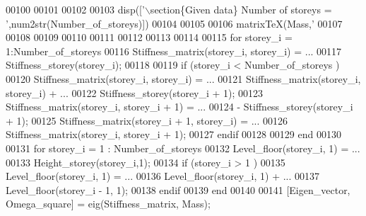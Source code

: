 \begin{DoxyCode}
{{{{{{{{{{{{{{{00100 \textcolor{stringliteral}{}
00101 \textcolor{stringliteral}{%
00102 \textcolor{stringliteral}{}
00103 \textcolor{stringliteral}{disp(['}\(\backslash\)section\{Given data\} Number of storeys = \textcolor{stringliteral}{',num2str(Number\_of\_storeys)])}
00104 \textcolor{stringliteral}{%
00105 \textcolor{stringliteral}{}
00106 \textcolor{stringliteral}{matrixTeX(Mass,'}%
00107 \textcolor{stringliteral}{}
00108 \textcolor{stringliteral}{%
00109 \textcolor{stringliteral}{}
00110 \textcolor{stringliteral}{%
00111 \textcolor{stringliteral}{}
00112 \textcolor{stringliteral}{%
00113 \textcolor{stringliteral}{%
00114 \textcolor{stringliteral}{}
00115 \textcolor{stringliteral}{for storey\_i = 1:Number\_of\_storeys}
00116 \textcolor{stringliteral}{  Stiffness\_matrix(storey\_i, storey\_i) = ...}
00117 \textcolor{stringliteral}{    Stiffness\_storey(storey\_i);}
00118 \textcolor{stringliteral}{}
00119 \textcolor{stringliteral}{  if (storey\_i < Number\_of\_storeys )}
00120 \textcolor{stringliteral}{    Stiffness\_matrix(storey\_i, storey\_i) = ...}
00121 \textcolor{stringliteral}{      Stiffness\_matrix(storey\_i, storey\_i) + ...}
00122 \textcolor{stringliteral}{      Stiffness\_storey(storey\_i + 1);}
00123 \textcolor{stringliteral}{    Stiffness\_matrix(storey\_i, storey\_i + 1) = ...}
00124 \textcolor{stringliteral}{      - Stiffness\_storey(storey\_i + 1);}
00125 \textcolor{stringliteral}{    Stiffness\_matrix(storey\_i + 1, storey\_i) = ...}
00126 \textcolor{stringliteral}{      Stiffness\_matrix(storey\_i, storey\_i + 1);}
00127 \textcolor{stringliteral}{   endif}
00128 \textcolor{stringliteral}{    }
00129 \textcolor{stringliteral}{end}
00130 \textcolor{stringliteral}{}
00131 \textcolor{stringliteral}{for storey\_i = 1 : Number\_of\_storeys}
00132 \textcolor{stringliteral}{  Level\_floor(storey\_i, 1) = ...}
00133 \textcolor{stringliteral}{    Height\_storey(storey\_i,1);}
00134 \textcolor{stringliteral}{  if (storey\_i > 1 )}
00135 \textcolor{stringliteral}{     Level\_floor(storey\_i, 1) = ...}
00136 \textcolor{stringliteral}{       Level\_floor(storey\_i, 1) + ...}
00137 \textcolor{stringliteral}{     Level\_floor(storey\_i - 1, 1);}
00138 \textcolor{stringliteral}{  endif}
00139 \textcolor{stringliteral}{end}
00140 \textcolor{stringliteral}{}
00141 \textcolor{stringliteral}{[Eigen\_vector, Omega\_square] = eig(Stiffness\_matrix, Mass);}
}}}}}}}}}}}}}}}}}}}}}
\end{DoxyCode}
